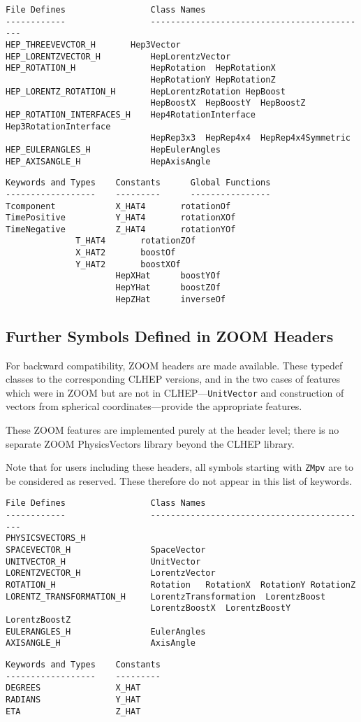 \begin{verbatim}
File Defines                 Class Names
------------                 --------------------------------------------
HEP_THREEVEVCTOR_H 	     Hep3Vector
HEP_LORENTZVECTOR_H          HepLorentzVector
HEP_ROTATION_H               HepRotation  HepRotationX  
                             HepRotationY HepRotationZ
HEP_LORENTZ_ROTATION_H       HepLorentzRotation HepBoost 
                             HepBoostX  HepBoostY  HepBoostZ
HEP_ROTATION_INTERFACES_H    Hep4RotationInterface  Hep3RotationInterface 
                             HepRep3x3  HepRep4x4  HepRep4x4Symmetric  
HEP_EULERANGLES_H            HepEulerAngles
HEP_AXISANGLE_H              HepAxisAngle
\end{verbatim}

\begin{verbatim}
Keywords and Types    Constants      Global Functions
------------------    ---------      ----------------	
Tcomponent            X_HAT4	   rotationOf
TimePositive          Y_HAT4       rotationXOf     
TimeNegative          Z_HAT4       rotationYOf         
		      T_HAT4       rotationZOf     
		      X_HAT2	   boostOf	
		      Y_HAT2	   boostXOf	
                      HepXHat      boostYOf
                      HepYHat      boostZOf
                      HepZHat      inverseOf
\end{verbatim}

\subsection {Further Symbols Defined in ZOOM Headers} 


For backward compatibility, ZOOM headers are made available.  
These typedef classes to the corresponding CLHEP versions, 
and in the two cases of features which were in ZOOM but are not in
CLHEP---{\tt UnitVector} and construction of vectors from 
spherical coordinates---provide the appropriate features.

These ZOOM features are implemented purely at the header level; there
is no separate ZOOM PhysicsVectors library beyond the CLHEP library.

Note that for users including these headers, all symbols starting with
{\tt ZMpv} are to be considered as reserved.  These therefore do not
appear in this list of keywords.

\begin{verbatim}
File Defines                 Class Names
------------                 --------------------------------------------
PHYSICSVECTORS_H 
SPACEVECTOR_H                SpaceVector 
UNITVECTOR_H                 UnitVector
LORENTZVECTOR_H              LorentzVector
ROTATION_H                   Rotation	RotationX  RotationY RotationZ
LORENTZ_TRANSFORMATION_H     LorentzTransformation  LorentzBoost 
                             LorentzBoostX  LorentzBoostY  LorentzBoostZ
EULERANGLES_H                EulerAngles
AXISANGLE_H                  AxisAngle
\end{verbatim}

\begin{verbatim}
Keywords and Types    Constants    
------------------    ---------    
DEGREES               X_HAT        
RADIANS               Y_HAT        
ETA                   Z_HAT        
\end{verbatim}


